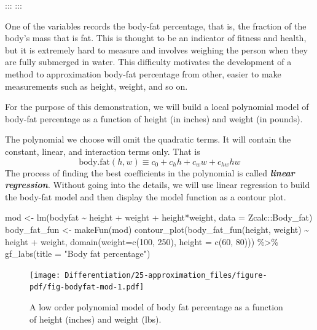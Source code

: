 \documentclass[
  letterpaper,
  DIV=11,
  numbers=noendperiod,
  oneside]{scrreprt}
\newenvironment{Shaded}{\begin{snugshade}}{\end{snugshade}}
\newcommand{\AttributeTok}[1]{\textcolor[rgb]{0.40,0.46,0.14}{#1}}
\newcommand{\DecValTok}[1]{\textcolor[rgb]{0.68,0.00,0.00}{#1}}
\newcommand{\FunctionTok}[1]{\textcolor[rgb]{0.28,0.35,0.67}{#1}}
\newcommand{\NormalTok}[1]{\textcolor[rgb]{0.00,0.46,0.62}{#1}}
\newcommand{\OtherTok}[1]{\textcolor[rgb]{0.00,0.46,0.62}{#1}}
\newcommand{\SpecialCharTok}[1]{\textcolor[rgb]{0.37,0.37,0.37}{#1}}
\newcommand{\StringTok}[1]{\textcolor[rgb]{0.13,0.47,0.30}{#1}}
\begin{document}
::: :::

One of the variables records the body-fat percentage, that is, the
fraction of the body's mass that is fat. This is thought to be an
indicator of fitness and health, but it is extremely hard to measure and
involves weighing the person when they are fully submerged in water.
This difficulty motivates the development of a method to approximation
body-fat percentage from other, easier to make measurements such as
height, weight, and so on.

For the purpose of this demonstration, we will build a local polynomial
model of body-fat percentage as a function of height (in inches) and
weight (in pounds).

The polynomial we choose will omit the quadratic terms. It will contain
the constant, linear, and interaction terms only. That is
\[\text{body.fat}(h, w) \equiv c_0 + c_h h + c_w w + c_{hw} h w\] The
process of finding the best coefficients in the polynomial is called
\textbf{\emph{linear regression}}. Without going into the details, we
will use linear regression to build the body-fat model and then display
the model function as a contour plot.

\begin{Shaded}
\begin{Highlighting}[]
\NormalTok{mod }\OtherTok{\textless{}{-}} \FunctionTok{lm}\NormalTok{(bodyfat }\SpecialCharTok{\textasciitilde{}}\NormalTok{ height }\SpecialCharTok{+}\NormalTok{ weight }\SpecialCharTok{+}\NormalTok{ height}\SpecialCharTok{*}\NormalTok{weight,}
          \AttributeTok{data =}\NormalTok{ Zcalc}\SpecialCharTok{::}\NormalTok{Body\_fat)}
\NormalTok{body\_fat\_fun }\OtherTok{\textless{}{-}} \FunctionTok{makeFun}\NormalTok{(mod)}
\FunctionTok{contour\_plot}\NormalTok{(}\FunctionTok{body\_fat\_fun}\NormalTok{(height, weight) }\SpecialCharTok{\textasciitilde{}}\NormalTok{ height }\SpecialCharTok{+}\NormalTok{ weight,}
             \FunctionTok{domain}\NormalTok{(}\AttributeTok{weight=}\FunctionTok{c}\NormalTok{(}\DecValTok{100}\NormalTok{, }\DecValTok{250}\NormalTok{), }\AttributeTok{height =} \FunctionTok{c}\NormalTok{(}\DecValTok{60}\NormalTok{, }\DecValTok{80}\NormalTok{))) }\SpecialCharTok{\%\textgreater{}\%}
  \FunctionTok{gf\_labs}\NormalTok{(}\AttributeTok{title =} \StringTok{"Body fat percentage"}\NormalTok{)}
\end{Highlighting}
\end{Shaded}

\begin{figure}[H]

{\centering \texttt{[image: Differentiation/25-approximation\_files/figure-pdf/fig-bodyfat-mod-1.pdf]}

}

\caption{\label{fig-bodyfat-mod}A low order polynomial model of body fat
percentage as a function of height (inches) and weight (lbs).}

\end{figure}
\end{document}
